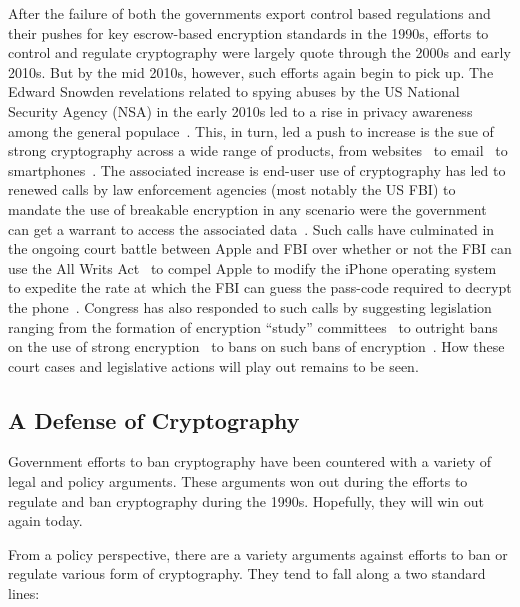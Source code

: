 After the failure of both the governments export control based
regulations and their pushes for key escrow-based encryption standards
in the 1990s, efforts to control and regulate cryptography were
largely quote through the 2000s and early 2010s. But by the mid 2010s,
however, such efforts again begin to pick up. The Edward Snowden
revelations related to spying abuses by the US National Security
Agency (NSA) in the early 2010s led to a rise in privacy awareness
among the general populace~\cite{pew-privsec14}. This, in turn, led a
push to increase is the sue of strong cryptography across a wide range
of products, from websites~\cite{mozilla-deprecatehttp} to
email~\cite{gmail-blog-encryption} to
smartphones~\cite{ars-ios-encrypt, ars-android-encrypt}. The
associated increase is end-user use of cryptography has led to renewed
calls by law enforcement agencies (most notably the US FBI) to mandate
the use of breakable encryption in any scenario were the government
can get a warrant to access the associated
data~\cite{comey-testimony-encryption}. Such calls have culminated in
the ongoing court battle between Apple and FBI over whether or not the
FBI can use the All Writs Act~\cite{usc-allwrits} to compel Apple to
modify the iPhone operating system to expedite the rate at which the
FBI can guess the pass-code required to decrypt the
phone~\cite{ars-cookvfbi}. Congress has also responded to such calls
by suggesting legislation ranging from the formation of encryption
``study'' committees~\cite{hr4651} to outright bans on the use of
strong encryption~\cite{bennett-burrbill} to bans on such bans of
encryption~\cite{hr4528}. How these court cases and legislative
actions will play out remains to be seen.

\subsection{A Defense of Cryptography}

Government efforts to ban cryptography have been countered with a
variety of legal and policy arguments. These arguments won out during
the efforts to regulate and ban cryptography during the
1990s. Hopefully, they will win out again today.

From a policy perspective, there are a variety arguments against
efforts to ban or regulate various form of cryptography. They tend to
fall along a two standard lines:

